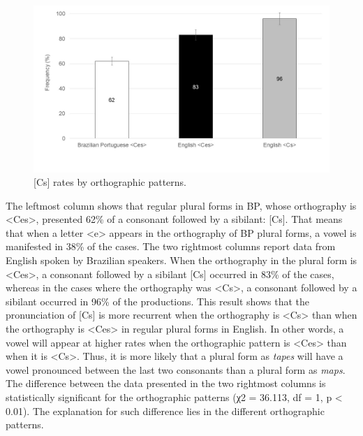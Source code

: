 \begin{figure}[h]
\centering
\includegraphics[width=\linewidth]{imgs/wellingfig01.png}
\caption{{[}Cs{]} rates by orthographic patterns.}
\label{wel-fig1}
\end{figure}

The leftmost column shows that regular plural forms in BP, whose
orthography is \textless Ces\textgreater, presented 62\% of a consonant
followed by a sibilant: {[}Cs{]}. That means that when a letter
\textless e\textgreater{} appears in the orthography of BP plural forms,
a vowel is manifested in 38\% of the cases. The two rightmost columns
report data from English spoken by Brazilian speakers. When the
orthography in the plural form is \textless Ces\textgreater, a consonant
followed by a sibilant {[}Cs{]} occurred in 83\% of the cases, whereas
in the cases where the orthography was \textless Cs\textgreater, a
consonant followed by a sibilant occurred in 96\% of the productions.
This result shows that the pronunciation of {[}Cs{]} is more recurrent
when the orthography is \textless Cs\textgreater{} than when the
orthography is \textless Ces\textgreater{} in regular plural forms in
English. In other words, a vowel will appear at higher rates when the
orthographic pattern is \textless Ces\textgreater{} than when it is
\textless Cs\textgreater. Thus, it is more likely that a plural form as
\emph{tapes} will have a vowel pronounced between the last two
consonants than a plural form as \emph{maps}. The difference between the
data presented in the two rightmost columns is statistically significant
for the orthographic patterns (χ2 = 36.113, df = 1, p \textless{} 0.01).
The explanation for such difference lies in the different orthographic
patterns.


